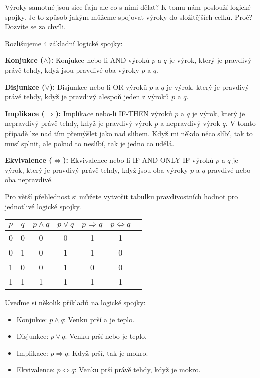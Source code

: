 Výroky samotné jsou sice fajn ale co s nimi dělat? K tomu nám poslouží logické spojky. Je to způsob jakým můžeme spojovat výroky do složitějších celků. Proč? Dozvíte se za chvíli.

\begin{definitionbox}
  Rozlišujeme 4 základní logické spojky:

  \textbf{Konjukce ($\land$):} Konjukce nebo-li AND výroků $p$ a $q$ je výrok, který je pravdivý právě tehdy, když jsou pravdivé oba výroky $p$ a $q$. 

  \textbf{Disjunkce ($\lor$):} Disjunkce nebo-li OR výroků $p$ a $q$ je výrok, který je pravdivý právě tehdy, když je pravdivý alespoň jeden z výroků $p$ a $q$.

  \textbf{Implikace ($\Rightarrow$):} Implikace nebo-li IF-THEN výroků $p$ a $q$ je výrok, který je nepravdivý právě tehdy, když je pravdivý výrok $p$ a nepravdivý výrok $q$. V tomto případě lze nad tím přemýšlet jako nad slibem. Když mi někdo něco slíbí, tak to musí splnit, ale pokud to neslíbí, tak je jedno co udělá.

  \textbf{Ekvivalence ($\Leftrightarrow$):} Ekvivalence nebo-li IF-AND-ONLY-IF výroků $p$ a $q$ je výrok, který je pravdivý právě tehdy, když jsou oba výroky $p$ a $q$ pravdivé nebo oba nepravdivé.

  \vspace{0.2cm}

  Pro větší přehlednost si můžete vytvořit tabulku pravdivostních hodnot pro jednotlivé logické spojky.

  \begin{center}
    \begin{tabular}{|c|c|c|c|c|c|c|}
      \hline
      $p$ & $q$ & $p \land q$ & $p \lor q$ & $p \Rightarrow q$ & $p \Leftrightarrow q$ \\
      \hline
      0 & 0 & 0 & 0 & 1 & 1 \\
      0 & 1 & 0 & 1 & 1 & 0 \\
      1 & 0 & 0 & 1 & 0 & 0 \\
      1 & 1 & 1 & 1 & 1 & 1 \\
      \hline
    \end{tabular}
  \end{center}
\end{definitionbox}

\pagebreak

\begin{example}
  Uveďme si několik příkladů na logické spojky:
  \begin{itemize}
    \item Konjukce: $p \land q$: Venku prší a je teplo.
    \item Disjunkce: $p \lor q$: Venku prší nebo je teplo.
    \item Implikace: $p \Rightarrow q$: Když prší, tak je mokro.
    \item Ekvivalence: $p \Leftrightarrow q$: Venku prší právě tehdy, když je mokro.
  \end{itemize}
\end{example}

